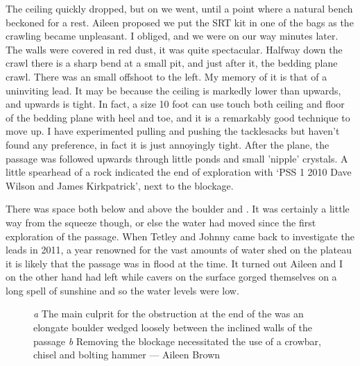 The ceiling quickly dropped, but on we went, until a point where a natural bench beckoned for a rest. Aileen proposed we put the SRT kit in one of the bags as the crawling became unpleasant. I obliged, and we were on our way minutes later. The walls were covered in red dust, it was quite spectacular. Halfway down the crawl there is a sharp bend at a small pit, and just after it, the bedding plane crawl. There was an small offshoot to the left. My memory of it is that of a uninviting lead. It may be because the ceiling is markedly lower than upwards, and upwards is tight. In fact, a size 10 foot can use touch both ceiling and floor of the bedding plane with heel and toe, and it is a remarkably good technique to move up. I have experimented pulling and pushing the tacklesacks but haven't found any preference, in fact it is just annoyingly tight. After the plane, the passage was followed upwards through little ponds and small 'nipple' crystals. A little spearhead of a rock indicated the end of exploration with `PSS  1 2010 Dave Wilson and James Kirkpatrick', next to the blockage.


There was space both below and above the boulder and . It was certainly a little way from the squeeze though, or else the water had moved since the first exploration of the passage. When Tetley and Johnny came back to investigate the leads in 2011, a year renowned for the vast amounts of water shed on the plateau it is likely that the passage was in flood at the time. It turned out Aileen and I on the other hand had left while cavers on the surface gorged themselves on a long spell of sunshine and so the water levels were low.

\begin{figure}[t!]
\checkoddpage \ifoddpage \forcerectofloat \else \forceversofloat \fi
\centering
    \begin{subfigure}[t]{0.421\textwidth}
        \centering
        \caption{} \label{boulder_kamikaze}
    \end{subfigure}
        \hfill
\begin{subfigure}[t]{0.560\textwidth}
\centering
{}
 \caption{}\label{end of kamikaze}
\end{subfigure}
  \caption{
    \emph{a} The main culprit for the obstruction at the end of the \protect{} was an elongate boulder wedged loosely between the inclined walls of the passage
     \emph{b}  Removing the blockage necessitated the use of a crowbar, chisel and bolting hammer --- Aileen Brown }
\end{figure}


